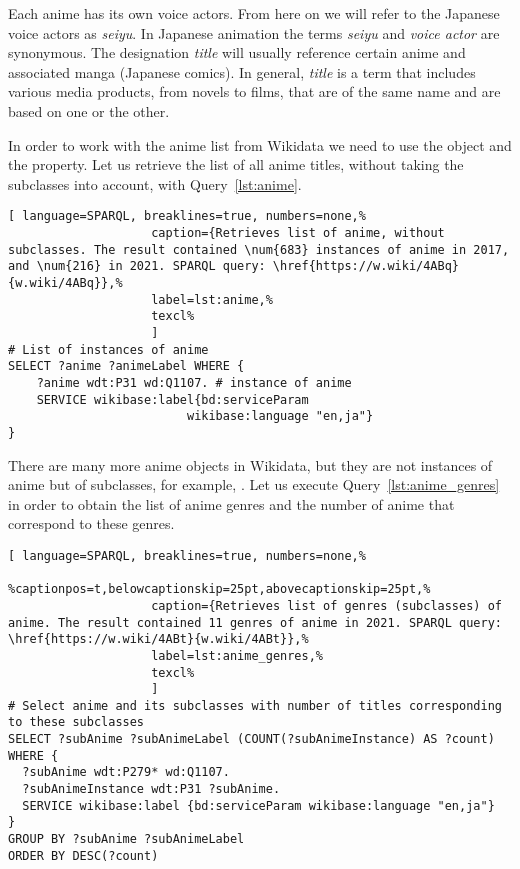 Each anime has its own voice actors. From here on we will refer to the Japanese voice actors as \emph{seiyu}. In Japanese animation the terms \emph{seiyu} and \emph{voice actor} are synonymous. The designation \emph{title} will usually reference certain anime and associated manga (Japanese comics). In general, \emph{title} is a term that includes various media products, from novels to films, that are of the same name and are based on one or the other.

In order to work with the anime list from Wikidata we need to use the  object and the  property. Let us retrieve the list of all anime titles, without taking the subclasses into account, with Query~\ref{lst:anime}.

\begin{lstlisting}[ language=SPARQL, breaklines=true, numbers=none,%
                    caption={Retrieves list of anime, without subclasses. The result contained \num{683} instances of anime in 2017, and \num{216} in 2021. SPARQL query: \href{https://w.wiki/4ABq}{w.wiki/4ABq}},%
                    label=lst:anime,%
                    texcl%
                    ]
# List of instances of anime
SELECT ?anime ?animeLabel WHERE {
    ?anime wdt:P31 wd:Q1107. # instance of anime
    SERVICE wikibase:label{bd:serviceParam
					     wikibase:language "en,ja"}
}
\end{lstlisting}%

There are many more anime objects in Wikidata, but they are not instances of anime but of subclasses, for example, . Let us execute Query~\ref{lst:anime_genres} in order to obtain the list of anime genres and the number of anime that correspond to these genres.

\begin{widepar}%
	\captionsetup[lstlisting]{%
        format=llapwide16 %
	}%
\begin{lstlisting}[ language=SPARQL, breaklines=true, numbers=none,%
                    %captionpos=t,belowcaptionskip=25pt,abovecaptionskip=25pt,%
                    caption={Retrieves list of genres (subclasses) of anime. The result contained 11 genres of anime in 2021. SPARQL query: \href{https://w.wiki/4ABt}{w.wiki/4ABt}},%
                    label=lst:anime_genres,%
                    texcl%
                    ]
# Select anime and its subclasses with number of titles corresponding to these subclasses
SELECT ?subAnime ?subAnimeLabel (COUNT(?subAnimeInstance) AS ?count) WHERE {
  ?subAnime wdt:P279* wd:Q1107.
  ?subAnimeInstance wdt:P31 ?subAnime.
  SERVICE wikibase:label {bd:serviceParam wikibase:language "en,ja"}
}
GROUP BY ?subAnime ?subAnimeLabel
ORDER BY DESC(?count)
\end{lstlisting}%
\end{widepar}%

